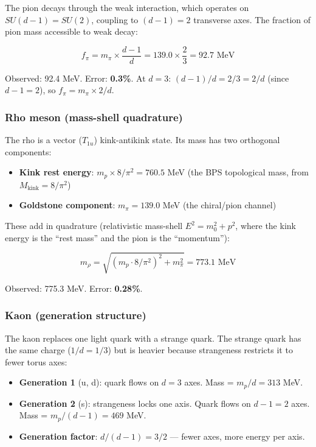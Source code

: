 \documentclass[
]{article}
\providecommand{\tightlist}{%
  \setlength{\itemsep}{0pt}\setlength{\parskip}{0pt}}
\begin{document}
The pion decays through the weak interaction, which operates on
\(SU(d\!-\!1) = SU(2)\), coupling to \((d\!-\!1) = 2\) transverse axes.
The fraction of pion mass accessible to weak decay:

\[f_\pi = m_\pi \times \frac{d-1}{d} = 139.0 \times \frac{2}{3} = 92.7 \text{ MeV}\]

Observed: 92.4 MeV. Error: \textbf{0.3\%}. At \(d = 3\):
\((d\!-\!1)/d = 2/3 = 2/d\) (since \(d\!-\!1 = 2\)), so
\(f_\pi = m_\pi \times 2/d\).

\subsubsection{Rho meson (mass-shell
quadrature)}\label{rho-meson-mass-shell-quadrature}

The rho is a vector (\(T_{1u}\)) kink-antikink state. Its mass has two
orthogonal components:

\begin{itemize}
\tightlist
\item
  \textbf{Kink rest energy}: \(m_p \times 8/\pi^2 = 760.5\) MeV (the BPS
  topological mass, from \(M_{\text{kink}} = 8/\pi^2\))
\item
  \textbf{Goldstone component}: \(m_\pi = 139.0\) MeV (the chiral/pion
  channel)
\end{itemize}

These add in quadrature (relativistic mass-shell \(E^2 = m_0^2 + p^2\),
where the kink energy is the ``rest mass'' and the pion is the
``momentum''):

\[m_\rho = \sqrt{(m_p \cdot 8/\pi^2)^2 + m_\pi^2} = 773.1 \text{ MeV}\]

Observed: 775.3 MeV. Error: \textbf{0.28\%}.

\subsubsection{Kaon (generation
structure)}\label{kaon-generation-structure}

The kaon replaces one light quark with a strange quark. The strange
quark has the same charge (\(1/d = 1/3\)) but is heavier because
strangeness restricts it to fewer torus axes:

\begin{itemize}
\tightlist
\item
  \textbf{Generation 1} (u, d): quark flows on \(d = 3\) axes. Mass =
  \(m_p/d = 313\) MeV.
\item
  \textbf{Generation 2} (s): strangeness locks one axis. Quark flows on
  \(d\!-\!1 = 2\) axes. Mass = \(m_p/(d\!-\!1) = 469\) MeV.
\item
  \textbf{Generation factor}: \(d/(d\!-\!1) = 3/2\) --- fewer axes, more
  energy per axis.
\end{itemize}
\end{document}

